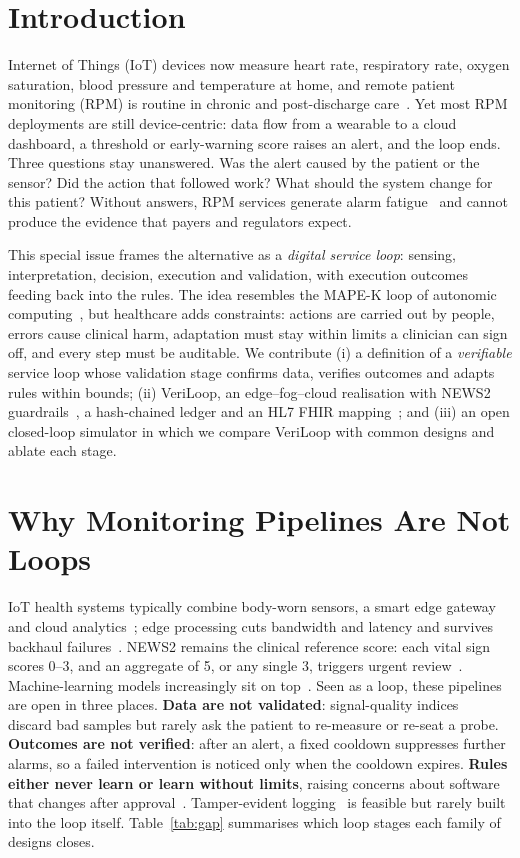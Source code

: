 \documentclass[journal,twoside,web]{IEEEmiot}
\begin{document}
\section{Introduction}

Internet of Things (IoT) devices now measure heart rate, respiratory rate, oxygen saturation, blood pressure and
temperature at home, and remote patient monitoring (RPM) is routine in chronic and post-discharge
care~\cite{islam2015,farahani2018}. Yet most RPM deployments are still device-centric: data flow from a wearable to a
cloud dashboard, a threshold or early-warning score raises an alert, and the loop ends. Three questions stay
unanswered. Was the alert caused by the patient or the sensor? Did the action that followed work? What should the
system change for this patient? Without answers, RPM services generate alarm fatigue~\cite{sendelbach2013} and cannot
produce the evidence that payers and regulators expect.

This special issue frames the alternative as a \emph{digital service loop}: sensing, interpretation, decision,
execution and validation, with execution outcomes feeding back into the rules. The idea resembles the MAPE-K loop of
autonomic computing~\cite{kephart2003}, but healthcare adds constraints: actions are carried out by people, errors cause
clinical harm, adaptation must stay within limits a clinician can sign off, and every step must be auditable. We
contribute (i) a definition of a \emph{verifiable} service loop whose validation stage confirms data, verifies
outcomes and adapts rules within bounds; (ii) VeriLoop, an edge--fog--cloud realisation with NEWS2
guardrails~\cite{rcp2017}, a hash-chained ledger and an HL7 FHIR mapping~\cite{fhir}; and (iii) an open closed-loop
simulator in which we compare VeriLoop with common designs and ablate each stage.

\section{Why Monitoring Pipelines Are Not Loops}

IoT health systems typically combine body-worn sensors, a smart edge gateway and cloud
analytics~\cite{hassanalieragh2015,rahmani2018}; edge processing cuts bandwidth and latency and survives backhaul
failures~\cite{shi2016}. NEWS2 remains the clinical reference score: each vital sign scores 0--3, and an aggregate of 5,
or any single 3, triggers urgent review~\cite{rcp2017,smith2013}. Machine-learning models increasingly sit on
top~\cite{rajkomar2019}. Seen as a loop, these pipelines are open in three places. \textbf{Data are not validated}:
signal-quality indices~\cite{orphanidou2015} discard bad samples but rarely ask the patient to re-measure or re-seat a
probe. \textbf{Outcomes are not verified}: after an alert, a fixed cooldown suppresses further alarms, so a failed
intervention is noticed only when the cooldown expires. \textbf{Rules either never learn or learn without limits},
raising concerns about software that changes after approval~\cite{fda2021}. Tamper-evident
logging~\cite{haber1991,azaria2016} is feasible but rarely built into the loop itself.
Table~\ref{tab:gap} summarises which loop stages each family of designs closes.
\end{document}

